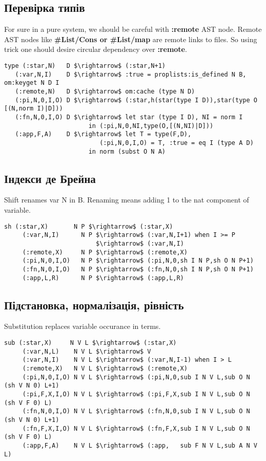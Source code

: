 \subsection{Перевірка типів}

For sure in a pure system, we should be careful with {\bf :remote} AST node.
Remote AST nodes like {\bf \#List/Cons or \#List/map} are remote links to files.
So using trick one should desire circular dependency over {\bf :remote}.

\begin{lstlisting}[mathescape=true]
type (:star,N)   D $\rightarrow$ (:star,N+1)
   (:var,N,I)    D $\rightarrow$ :true = proplists:is_defined N B, om:keyget N D I
   (:remote,N)   D $\rightarrow$ om:cache (type N D)
   (:pi,N,0,I,O) D $\rightarrow$ (:star,h(star(type I D)),star(type O [(N,norm I)|D]))
   (:fn,N,0,I,O) D $\rightarrow$ let star (type I D), NI = norm I
                       in (:pi,N,0,NI,type(O,[(N,NI)|D]))
   (:app,F,A)    D $\rightarrow$ let T = type(F,D),
                          (:pi,N,0,I,O) = T, :true = eq I (type A D)
                       in norm (subst O N A)
\end{lstlisting}

\subsection{Індекси де Брейна}

Shift renames var N in B. Renaming means adding 1 to the nat component of variable.

\begin{lstlisting}[mathescape=true]
  sh (:star,X)       N P $\rightarrow$ (:star,X)
     (:var,N,I)      N P $\rightarrow$ (:var,N,I+1) when I >= P
                         $\rightarrow$ (:var,N,I)
     (:remote,X)     N P $\rightarrow$ (:remote,X)
     (:pi,N,0,I,O)   N P $\rightarrow$ (:pi,N,0,sh I N P,sh O N P+1)
     (:fn,N,0,I,O)   N P $\rightarrow$ (:fn,N,0,sh I N P,sh O N P+1)
     (:app,L,R)      N P $\rightarrow$ (:app,L,R)
\end{lstlisting}

\subsection{Підстановка, нормалізація, рівність}
Substitution replaces variable occurance in terms.

\begin{lstlisting}[mathescape=true]
 sub (:star,X)     N V L $\rightarrow$ (:star,X)
     (:var,N,L)    N V L $\rightarrow$ V
     (:var,N,I)    N V L $\rightarrow$ (:var,N,I-1) when I > L
     (:remote,X)   N V L $\rightarrow$ (:remote,X)
     (:pi,N,0,I,O) N V L $\rightarrow$ (:pi,N,0,sub I N V L,sub O N (sh V N 0) L+1)
     (:pi,F,X,I,O) N V L $\rightarrow$ (:pi,F,X,sub I N V L,sub O N (sh V F 0) L)
     (:fn,N,0,I,O) N V L $\rightarrow$ (:fn,N,0,sub I N V L,sub O N (sh V N 0) L+1)
     (:fn,F,X,I,O) N V L $\rightarrow$ (:fn,F,X,sub I N V L,sub O N (sh V F 0) L)
     (:app,F,A)    N V L $\rightarrow$ (:app,   sub F N V L,sub A N V L)
\end{lstlisting}

